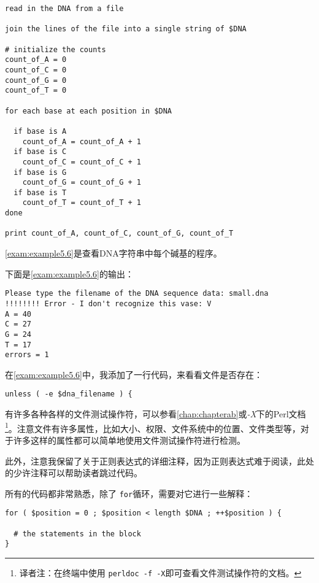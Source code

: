 \begin{lstlisting}
read in the DNA from a file

join the lines of the file into a single string of $DNA

# initialize the counts
count_of_A = 0
count_of_C = 0
count_of_G = 0
count_of_T = 0

for each base at each position in $DNA

  if base is A
    count_of_A = count_of_A + 1
  if base is C
    count_of_C = count_of_C + 1
  if base is G
    count_of_G = count_of_G + 1
  if base is T
    count_of_T = count_of_T + 1
done

print count_of_A, count_of_C, count_of_G, count_of_T
\end{lstlisting}

\autoref{exam:example5.6}是查看DNA字符串中每个碱基的程序。



下面是\autoref{exam:example5.6}的输出：

\begin{lstlisting}
Please type the filename of the DNA sequence data: small.dna
!!!!!!!! Error - I don't recognize this vase: V
A = 40
C = 27
G = 24
T = 17
errors = 1
\end{lstlisting}

在\autoref{exam:example5.6}中，我添加了一行代码，来看看文件是否存在：

\begin{lstlisting}
unless ( -e $dna_filename ) {
\end{lstlisting}

有许多各种各样的文件测试操作符，可以参看\autoref{chap:chapterab}或\textit{-X}下的Perl文档\footnote{译者注：在终端中使用 \verb|perldoc -f -X|即可查看文件测试操作符的文档。}。注意文件有许多属性，比如大小、权限、文件系统中的位置、文件类型等，对于许多这样的属性都可以简单地使用文件测试操作符进行检测。

此外，注意我保留了关于正则表达式的详细注释，因为正则表达式难于阅读，此处的少许注释可以帮助读者跳过代码。

所有的代码都非常熟悉，除了 \verb|for|循环，需要对它进行一些解释：

\begin{lstlisting}
for ( $position = 0 ; $position < length $DNA ; ++$position ) {
  
  # the statements in the block
}
\end{lstlisting}

